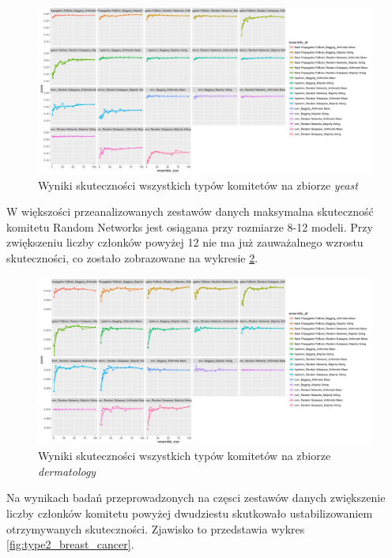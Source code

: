 \documentclass[11pt, a4paper, titlepage]{report}
\begin{document}
\begin{figure}[H]
	\includegraphics[width=1.0\textwidth]{type2_score_size_model_yeast}
    \centering
    \caption{Wyniki skuteczności wszystkich typów komitetów na zbiorze \textit{yeast}}
    \label{fig:type2_yeast}
\end{figure}

W większości przeanalizowanych zestawów danych maksymalna skuteczność komitetu Random Networks jest osiągana przy rozmiarze 8-12 modeli. Przy zwiększeniu liczby członków powyżej 12 nie ma już zauważalnego wzrostu skuteczności, co zostało zobrazowane na wykresie \ref{fig:type2_dermatology}. 

\begin{figure}[H]
	\includegraphics[width=1.0\textwidth]{type2_score_size_model_dermatology}
    \centering
    \caption{Wyniki skuteczności wszystkich typów komitetów na zbiorze \textit{dermatology}}
    \label{fig:type2_dermatology}
\end{figure}

Na wynikach badań przeprowadzonych na częsci zestawów danych zwiększenie liczby członków komitetu powyżej dwudziestu skutkowało ustabilizowaniem otrzymywanych skuteczności. Zjawisko to przedstawia wykres \ref{fig:type2_breast_cancer}.
\end{document}
